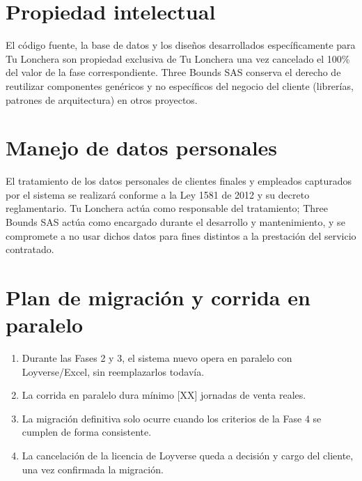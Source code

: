 \documentclass[11pt,a4paper]{article}
\begin{document}
\section{Propiedad intelectual}
El código fuente, la base de datos y los diseños desarrollados específicamente para Tu Lonchera son propiedad exclusiva de Tu Lonchera una vez cancelado el 100\% del valor de la fase correspondiente. Three Bounds SAS conserva el derecho de reutilizar componentes genéricos y no específicos del negocio del cliente (librerías, patrones de arquitectura) en otros proyectos.

\section{Manejo de datos personales}
El tratamiento de los datos personales de clientes finales y empleados capturados por el sistema se realizará conforme a la Ley 1581 de 2012 y su decreto reglamentario. Tu Lonchera actúa como responsable del tratamiento; Three Bounds SAS actúa como encargado durante el desarrollo y mantenimiento, y se compromete a no usar dichos datos para fines distintos a la prestación del servicio contratado.

\section{Plan de migración y corrida en paralelo}

\begin{center}
\end{center}

\begin{enumerate}
    \item Durante las Fases 2 y 3, el sistema nuevo opera en paralelo con Loyverse/Excel, sin reemplazarlos todavía.
    \item La corrida en paralelo dura mínimo [XX] jornadas de venta reales.
    \item La migración definitiva solo ocurre cuando los criterios de la Fase 4 se cumplen de forma consistente.
    \item La cancelación de la licencia de Loyverse queda a decisión y cargo del cliente, una vez confirmada la migración.
\end{enumerate}
\end{document}

